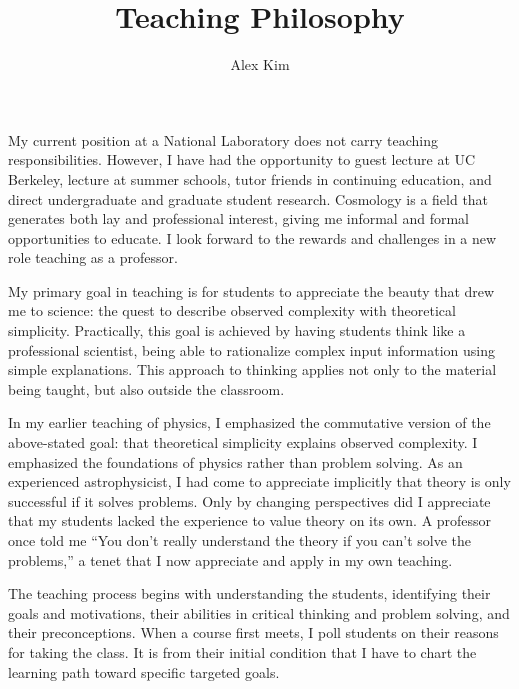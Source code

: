 \documentclass[12pt]{article}
\date{}
\begin{document}
\title{Teaching Philosophy}
\author{Alex Kim}
\maketitle

My current position at a National Laboratory does not carry teaching responsibilities.  However,
I have had the opportunity to guest lecture at UC Berkeley, lecture at summer schools, tutor friends
in continuing education, and direct undergraduate and graduate student research.  Cosmology
is a field that generates both lay and professional interest, giving me informal and formal opportunities to
educate.  I look forward to the rewards and challenges in a new role teaching as a professor. 

My primary goal in teaching is for students to appreciate the beauty that drew me to science: the quest to
describe  observed complexity with
theoretical simplicity.  Practically, this goal is achieved by having students think like a professional scientist, being able to 
rationalize complex input information using simple explanations.
This approach to thinking applies not only to the material being taught,  but also
outside the classroom.

In my earlier teaching of physics,  I emphasized the commutative version
of the above-stated goal: that theoretical simplicity explains observed complexity.  I  emphasized the foundations of physics
rather than problem solving. As an experienced astrophysicist, I had come to
appreciate implicitly that theory is only successful if it solves problems.  Only by changing perspectives
did I appreciate that my students lacked the experience
to value theory on its own.  A  professor once told me
``You don't really understand the theory if you can't solve the problems,'' a tenet that I now  appreciate and
apply in my own teaching.


The teaching process  begins with understanding the students, identifying their goals and motivations, their abilities in critical thinking and
problem solving, and their preconceptions.  When a course first meets, I poll students on their reasons for taking the
class.  It is from their initial condition that I have to chart the learning path toward specific targeted goals. 
\end{document}
